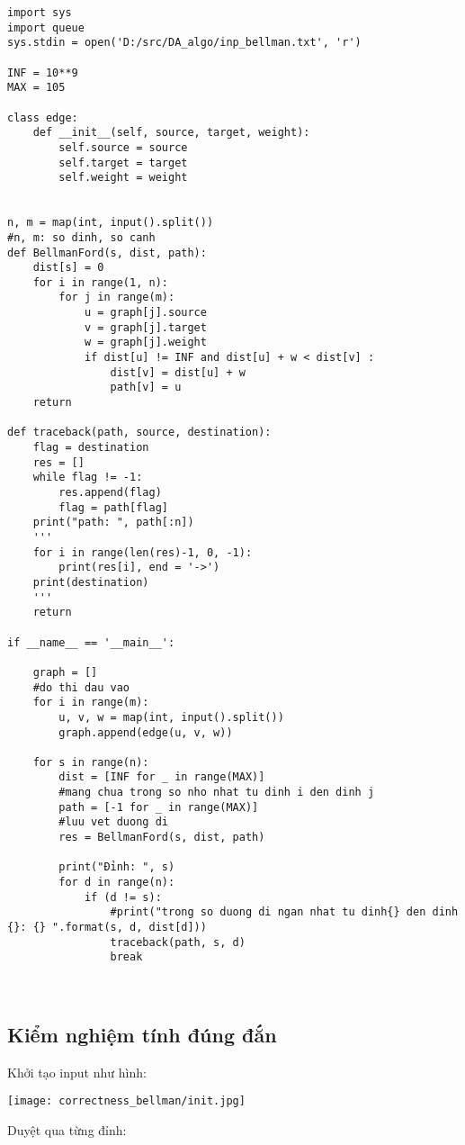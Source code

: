 \documentclass[a4paper]{article}
\begin{document}
\begin{mdframed}[hidealllines=true,backgroundcolor=magenta!10]
		\begin{lstlisting}
import sys
import queue
sys.stdin = open('D:/src/DA_algo/inp_bellman.txt', 'r')

INF = 10**9
MAX = 105

class edge:
    def __init__(self, source, target, weight):
        self.source = source
        self.target = target
        self.weight = weight


n, m = map(int, input().split())
#n, m: so dinh, so canh 
def BellmanFord(s, dist, path):
    dist[s] = 0
    for i in range(1, n):
        for j in range(m):
            u = graph[j].source
            v = graph[j].target
            w = graph[j].weight
            if dist[u] != INF and dist[u] + w < dist[v] :
                dist[v] = dist[u] + w
                path[v] = u
    return 

def traceback(path, source, destination):
    flag = destination
    res = []
    while flag != -1:
        res.append(flag)
        flag = path[flag]
    print("path: ", path[:n])
    '''
    for i in range(len(res)-1, 0, -1):
        print(res[i], end = '->')
    print(destination)
    '''
    return 
        
if __name__ == '__main__':
    
    graph = []
    #do thi dau vao
    for i in range(m):
        u, v, w = map(int, input().split())
        graph.append(edge(u, v, w))
    
    for s in range(n):
        dist = [INF for _ in range(MAX)]
        #mang chua trong so nho nhat tu dinh i den dinh j
        path = [-1 for _ in range(MAX)]
        #luu vet duong di
        res = BellmanFord(s, dist, path)
        
        print("Đỉnh: ", s)
        for d in range(n):
            if (d != s):
                #print("trong so duong di ngan nhat tu dinh{} den dinh {}: {} ".format(s, d, dist[d]))
                traceback(path, s, d)
                break
        
    
		\end{lstlisting}
	\end{mdframed}
	
\subsection{Kiểm nghiệm tính đúng đắn}
Khởi tạo input như hình:
\begin{center}
    \texttt{[image: correctness\_bellman/init.jpg]}
\end{center}
Duyệt qua từng đỉnh:
\end{document}

